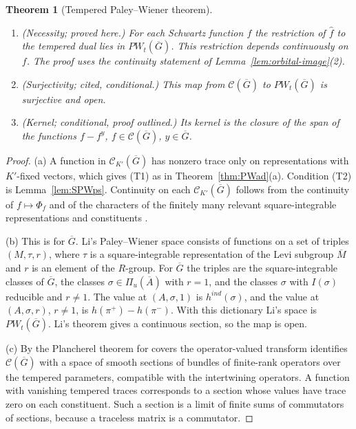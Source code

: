 \documentclass[12pt,letterpaper]{article}
\numberwithin{equation}{section}
\newtheorem{theorem}{Theorem}[section]
\theoremstyle{definition}
\newcommand{\proved}{proved here}
\newcommand{\cited}{cited}
\newcommand{\cond}{conditional}
\newcommand{\outl}{proof outlined}
\newcommand{\bG}{\overline{G}}
\newcommand{\bA}{\overline{A}}
\newcommand{\calC}{\mathcal C}
\begin{document}
\begin{theorem}[Tempered Paley--Wiener theorem]\label{thm:PWt}
\begin{enumerate}[label=(\alph*),leftmargin=*,itemsep=1pt]
\item (Necessity; \proved.)
For each Schwartz function $f$ the restriction of $\hat f$ to the tempered dual lies in
$PW_t(\bG)$.  This restriction depends continuously on $f$.  The proof uses the
continuity statement of Lemma~\ref{lem:orbital-image}(2).
\item (Surjectivity; \cited, \cond.)  This map from $\calC(\bG)$ to $PW_t(\bG)$ is
surjective and open.
\item (Kernel; \cond, \outl.)  Its kernel is the closure of the span of the functions
$f-f^y$, $f\in\calC(\bG)$, $y\in\bG$.
\end{enumerate}
\end{theorem}
\begin{proof}
(a) A function in $\calC_{K'}(\bG)$ has nonzero trace only on representations with
$K'$-fixed vectors, which gives (T1) as in Theorem~\ref{thm:PWad}(a).  Condition (T2) is
Lemma~\ref{lem:SPWps}.  Continuity on each $\calC_{K'}(\bG)$ follows from the continuity of
$f\mapsto\Phi_f$ and of the characters of the finitely many relevant square-integrable
representations and constituents \cite[\S2]{Li12}.

(b) This is \cite[Th\'eor\`eme~5.6.10]{Li12} for $\bG$.  Li's Paley--Wiener space consists
of functions on a set of triples $(M,\tau,r)$, where $\tau$ is a square-integrable
representation of the Levi subgroup $\overline M$ and $r$ is an element of the $R$-group.
For $\bG$ the triples are the square-integrable classes of $\bG$, the classes
$\sigma\in\Pi_u(\bA)$ with $r=1$, and the classes $\sigma$ with $I(\sigma)$ reducible and
$r\ne1$.  The value at $(A,\sigma,1)$ is $h^{ind}(\sigma)$, and the value at $(A,\sigma,r)$,
$r\ne1$, is $h(\pi^+)-h(\pi^-)$.  With this dictionary Li's space is $PW_t(\bG)$.  Li's
theorem gives a continuous section, so the map is open.

(c) By the Plancherel theorem for covers \cite[Th\'eor\`eme~2.6.4]{Li12} the
operator-valued transform identifies $\calC(\bG)$ with a space of smooth sections of
bundles of finite-rank operators over the tempered parameters, compatible with the
intertwining operators.  A function with vanishing tempered traces corresponds to a
section whose values have trace zero on each constituent.  Such a section is a limit of
finite sums of commutators of sections, because a traceless matrix is a commutator.
\end{proof}
\end{document}
